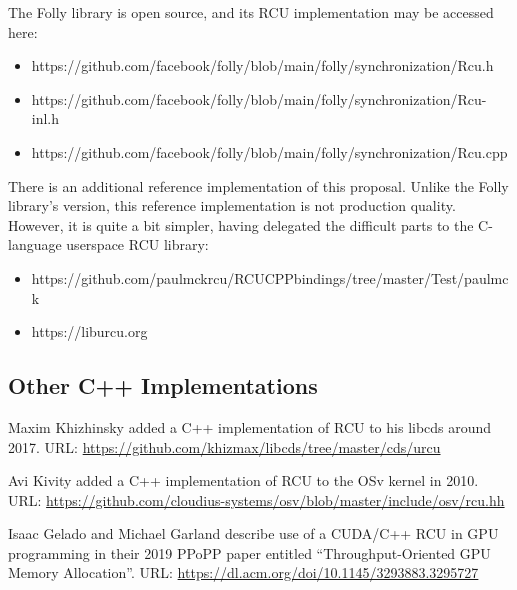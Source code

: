 The Folly library is open source, and its RCU implementation may be
accessed here:

\begin{itemize}
\item	https://github.com/facebook/folly/blob/main/folly/synchronization/Rcu.h
\item	https://github.com/facebook/folly/blob/main/folly/synchronization/Rcu-inl.h
\item	https://github.com/facebook/folly/blob/main/folly/synchronization/Rcu.cpp
\end{itemize}

There is an additional reference implementation of this proposal.
Unlike the Folly library's version, this reference implementation is
not production quality.
However, it is quite a bit simpler, having delegated the difficult parts
to the C-language userspace RCU library:

\begin{itemize}
\item	https://github.com/paulmckrcu/RCUCPPbindings/tree/master/Test/paulmck
\item	https://liburcu.org
\end{itemize}

\subsection{Other C++ Implementations}
\label{sec:Other C++ Implementations}

Maxim Khizhinsky added a C++ implementation of RCU to his libcds
around 2017.
URL: \url{https://github.com/khizmax/libcds/tree/master/cds/urcu}

Avi Kivity added a C++ implementation of RCU to the OSv kernel in
2010.
URL: \url{https://github.com/cloudius-systems/osv/blob/master/include/osv/rcu.hh}


Isaac Gelado and Michael Garland describe use of a CUDA/C++ RCU in GPU
programming in their 2019 PPoPP paper entitled ``Throughput-Oriented
GPU Memory Allocation''.
URL: \url{https://dl.acm.org/doi/10.1145/3293883.3295727}

